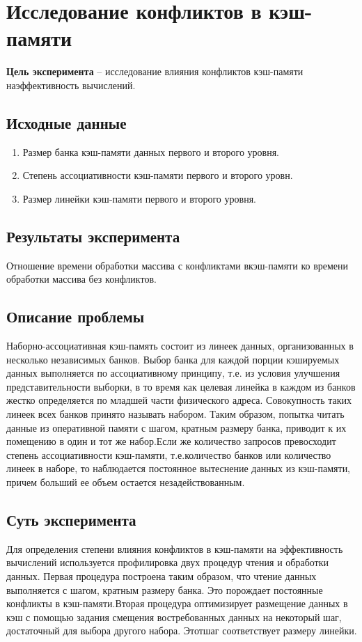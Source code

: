 \section{Исследование конфликтов в кэш-памяти}

\textbf{Цель эксперимента} -- исследование   влияния   конфликтов   кэш-памяти   наэффективность вычислений.

\subsection{Исходные данные}
\begin{enumerate}
	\item Размер банка кэш-памяти данных первого и второго уровня.
	\item Степень ассоциативности кэш-памяти первого и второго уровн.
	\item Размер линейки кэш-памяти первого и второго уровня.
\end{enumerate}

\subsection{Результаты эксперимента}
Отношение времени обработки массива с конфликтами вкэш-памяти ко времени обработки массива без конфликтов.


\subsection{Описание проблемы}
Наборно-ассоциативная кэш-память состоит из линеек данных, организованных в несколько независимых банков. Выбор банка для каждой порции кэшируемых данных выполняется по ассоциативному принципу, т.е. из условия улучшения представительности выборки, в то время как целевая линейка в каждом из банков жестко определяется по младшей части физического адреса. Совокупность таких линеек всех банков принято называть набором. Таким образом, попытка читать данные из оперативной памяти с шагом, кратным размеру банка, приводит к их помещению в один и тот же набор.Если же количество запросов превосходит степень ассоциативности кэш-памяти, т.е.количество банков или количество линеек в наборе, то наблюдается постоянное вытеснение данных из кэш-памяти, причем больший ее объем  остается незадействованным.

\subsection{Суть эксперимента}  
Для определения степени влияния конфликтов в кэш-памяти на эффективность вычислений используется профилировка двух процедур чтения и обработки данных. Первая процедура построена таким образом, что чтение данных выполняется с шагом, кратным размеру банка. Это порождает постоянные конфликты в кэш-памяти.Вторая процедура оптимизирует размещение данных в кэш с помощью задания смещения востребованных данных на некоторый шаг, достаточный для выбора другого набора. Этотшаг соответствует размеру линейки.  


